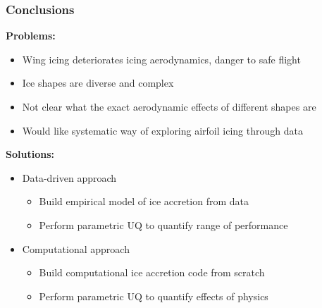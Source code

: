 \documentclass[9pt]{beamer}
\begin{document}
\begin{frame}
\frametitle{Conclusions}
\label{sec-4-10}

\textbf{Problems:}
\begin{itemize}
\item Wing icing deteriorates icing aerodynamics, danger to safe flight
\item Ice shapes are diverse and complex
\item Not clear what the exact aerodynamic effects of different shapes are
\item Would like systematic way of exploring airfoil icing through data
\end{itemize}
\textbf{Solutions:}
\begin{itemize}
\item Data-driven approach
\begin{itemize}
\item Build empirical model of ice accretion from data
\item Perform parametric UQ to quantify range of performance
\end{itemize}
\item Computational approach
\begin{itemize}
\item Build computational ice accretion code from scratch
\item Perform parametric UQ to quantify effects of physics
\end{itemize}
\end{itemize}







 
\end{frame}
\end{document}
